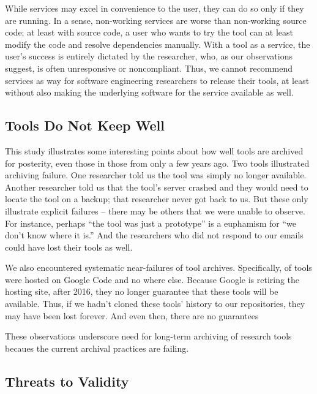 \documentclass[10pt,conference]{IEEEtran}
\begin{document}
While services may excel in convenience to the user, 
they can do so only if they are running.
In a sense, non-working services are worse than non-working source code;
at least with source code, a user who wants to try the tool can 
at least modify the code and resolve dependencies manually.
With a tool as a service, the user's success is entirely dictated
by the researcher, who, as our observations suggest, is often
unresponsive or noncompliant. 
Thus, we cannot recommend services as  way for software
engineering researchers to release their tools,
at least without also making the underlying software for 
the service available as well.  

\subsection{Tools Do Not Keep Well}

This study illustrates some interesting points about how well tools
are archived for posterity, even those in those from only a few years ago.
Two tools illustrated archiving failure.
One researcher told us the tool was simply no longer available.
Another researcher told us that the tool's server crashed and they
would need to locate the tool on a backup; that researcher never got back to us.
But these only illustrate explicit failures -- there may be others 
that we were unable to observe.
For instance, perhaps ``the tool was just a prototype'' is a euphamism for 
``we don't know where it is.''
And the researchers who did not respond to our emails 
could have lost their tools as well.

We also encountered systematic near-failures of tool archives.
Specifically, \onlineJustGcode of tools were hosted on Google Code
and no where else.
Because Google is retiring the hosting site, after 2016,
they no longer guarantee that these tools will be available.
Thus, if we hadn't cloned these tools' history to our repositories,
they may have been lost forever.
And even then, there are no guarantees

These observations underscore need for long-term archiving of research
tools becaues the current archival practices are failing.
 
\subsection{Threats to Validity}

\end{document}
